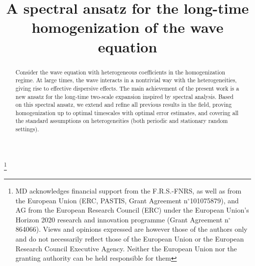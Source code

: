 \documentclass[JEP,XML,SOM,Unicode,published]{cedram}
\theoremstyle{plain}
\theoremstyle{definition}
\numberwithin{equation}{section}
\begin{document}
\title[Long-time homogenization of the wave equation]{A spectral ansatz for the long-time homogenization of the wave equation}

\author[\initial{M.} \lastname{Duerinckx}]{ }
\address{Université Libre de Bruxelles, Département de Mathématique,\\ 1050 Brussels, Belgium}

\author[\initial{A.} \lastname{Gloria}]{ }
\address{Sorbonne Université, CNRS, Université de Paris, Laboratoire Jacques-Louis Lions,\\ 75005~Paris, France\\
\& Institut Universitaire de France\\
\& Université Libre de Bruxelles, Département de Mathématique,\\
1050~Brussels, Belgium}

\author[\initial{M.} \lastname{Ruf}]{ }
\address{École Polytechnique Fédérale de Lausanne, Section de mathématiques,\\ 1015~Lausanne, Switzerland}

\thanks{MD acknowledges financial support from the F.R.S.-FNRS, as well as from the European Union (ERC, PASTIS, Grant Agreement n$^\circ$101075879), and AG from the European Research Council (ERC) under the European Union's Horizon 2020 research and innovation programme (Grant Agreement n$^\circ$864066). Views and opinions expressed are however those of the authors only and do not necessarily reflect those of the European Union or the European Research Council Executive Agency. Neither the European Union nor the granting authority can be held responsible for them}

\begin{abstract}
Consider the wave equation with heterogeneous coefficients in the homogenization regime. At large times, the wave interacts in a nontrivial way with the heterogeneities, giving rise to effective dispersive effects. The main achievement of the present work is a new ansatz for the long-time two-scale expansion inspired by spectral analysis. Based on this spectral ansatz, we extend and refine all previous results in the field, proving homogenization up to optimal timescales with optimal error estimates, and covering all the standard assumptions on heterogeneities (both periodic and stationary random settings).
\end{abstract}
\end{document}

